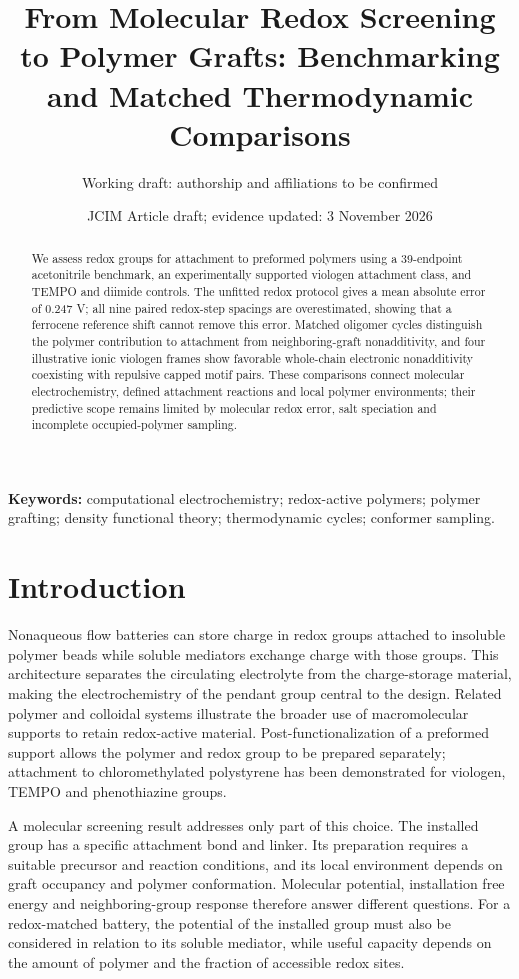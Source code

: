 \documentclass[11pt]{article}
\title{From Molecular Redox Screening to Polymer Grafts: Benchmarking and Matched Thermodynamic Comparisons}
\author{Working draft: authorship and affiliations to be confirmed}
\date{JCIM Article draft; evidence updated: 3 November 2026}
\begin{document}
\maketitle

\begin{abstract}
We assess redox groups for attachment to preformed polymers using a 39-endpoint acetonitrile benchmark, an experimentally supported viologen attachment class, and TEMPO and diimide controls. The unfitted redox protocol gives a mean absolute error of 0.247 V; all nine paired redox-step spacings are overestimated, showing that a ferrocene reference shift cannot remove this error. Matched oligomer cycles distinguish the polymer contribution to attachment from neighboring-graft nonadditivity, and four illustrative ionic viologen frames show favorable whole-chain electronic nonadditivity coexisting with repulsive capped motif pairs. These comparisons connect molecular electrochemistry, defined attachment reactions and local polymer environments; their predictive scope remains limited by molecular redox error, salt speciation and incomplete occupied-polymer sampling.
\end{abstract}
\noindent\textbf{Keywords:} computational electrochemistry; redox-active polymers; polymer grafting; density functional theory; thermodynamic cycles; conformer sampling.

\section{Introduction}
Nonaqueous flow batteries can store charge in redox groups attached to insoluble polymer beads while soluble mediators exchange charge with those groups. This architecture separates the circulating electrolyte from the charge-storage material, making the electrochemistry of the pendant group central to the design.\cite{kim2022} Related polymer and colloidal systems illustrate the broader use of macromolecular supports to retain redox-active material.\cite{janoschka2015,montoto2016} Post-functionalization of a preformed support allows the polymer and redox group to be prepared separately; attachment to chloromethylated polystyrene has been demonstrated for viologen, TEMPO and phenothiazine groups.\cite{kim2022,sommerlade2002tempo,wright1989supported,ohbiying2025upcycling}

A molecular screening result addresses only part of this choice. The installed group has a specific attachment bond and linker. Its preparation requires a suitable precursor and reaction conditions, and its local environment depends on graft occupancy and polymer conformation. Molecular potential, installation free energy and neighboring-group response therefore answer different questions. For a redox-matched battery, the potential of the installed group must also be considered in relation to its soluble mediator, while useful capacity depends on the amount of polymer and the fraction of accessible redox sites.\cite{kim2022}
\end{document}
